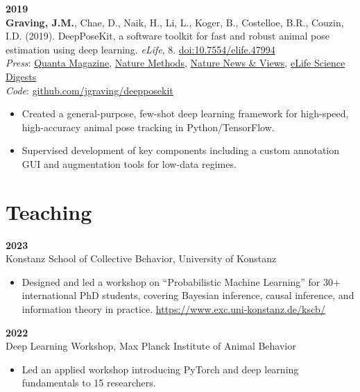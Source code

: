 \documentclass[10pt,letterpaper]{article}
\begin{document}
	\vspace{4pt}
	\textbf{2019}\\
	\textbf{Graving, J.M.}, Chae, D., Naik, H., Li, L., Koger, B., Costelloe, B.R., Couzin, I.D. (2019). DeepPoseKit, a software toolkit for fast and robust animal pose estimation using deep learning. \textit{eLife}, 8. \href{https://doi.org/10.7554/elife.47994}{doi:10.7554/elife.47994} \\
	\textit{Press}: \href{https://www.quantamagazine.org/to-decode-the-brain-scientists-automate-the-study-of-behavior-20191210/}{Quanta Magazine}, 
	\href{https://doi.org/10.1038/s41592-019-0678-2}{Nature Methods},
	\href{https://doi.org/10.1038/d41586-019-02942-5}{Nature News \& Views},
	\href{https://elifesciences.org/digests/47994/machine-learning-animal-poses-to-understand-behavior}{eLife Science Digests} \\
	\textit{Code}: \href{https://github.com/jgraving/deepposekit}{github.com/jgraving/deepposekit}
	\begin{itemize}
		\item Created a general-purpose, few-shot deep learning framework for high-speed, high-accuracy animal pose tracking in Python/TensorFlow.
		\item Supervised development of key components including a custom annotation GUI and augmentation tools for low-data regimes.
	\end{itemize}
	
	\section*{Teaching}
	\textbf{2023}\\
	Konstanz School of Collective Behavior, University of Konstanz
	\begin{itemize}
		\item Designed and led a workshop on “Probabilistic Machine Learning” for 30+ international PhD students, covering Bayesian inference, causal inference, and information theory in practice. \href{https://www.exc.uni-konstanz.de/kscb/}{https://www.exc.uni-konstanz.de/kscb/}
	\end{itemize}
	
	\vspace{4pt}
	\textbf{2022}\\
	Deep Learning Workshop, Max Planck Institute of Animal Behavior
	\begin{itemize}
		\item Led an applied workshop introducing PyTorch and deep learning fundamentals to 15 researchers.
	\end{itemize}
	
\end{document}
